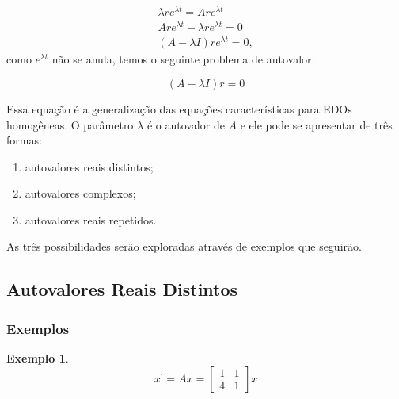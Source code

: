 \documentclass[a4paper,portuguese,9pt,final]{extarticle}
\newtheorem{example}{Exemplo}[section]
\begin{document}
\begin{multicols*}{2}
            \begin{equation*}
                \begin{split}
                    \lambda r e^{\lambda t} = A r e^{\lambda t} \\
                    Ar e^{\lambda t} - \lambda r e^{\lambda t} = 0\\
                    (A-\lambda I)r e^{\lambda t} = 0,
                \end{split}
            \end{equation*}
            como $e^{\lambda t}$ não se anula, temos o seguinte problema de autovalor:
            
            \begin{equation*}
                (A-\lambda I)r =0
            \end{equation*}
            
            Essa equação é a generalização das equações características para EDOs homogêneas. O parâmetro $\lambda$ é o autovalor de $A$ e ele pode se apresentar de três formas:
            
            \begin{enumerate}[label=(\roman*)]
        \item autovalores reais distintos;
        \item autovalores complexos;
        \item autovalores reais repetidos.
    \end{enumerate}
As três possibilidades serão exploradas através de exemplos que seguirão.

            \subsection{Autovalores Reais Distintos}
            
                \subsubsection{Exemplos}
                
                \begin{example}
                  \begin{equation*}
                      x^\prime = Ax = \begin{bmatrix}
                                     1 & 1\\
                                     4 & 1
                                     \end{bmatrix} x 
                  \end{equation*}
                  

\end{example}
\end{multicols*}
\end{document}
